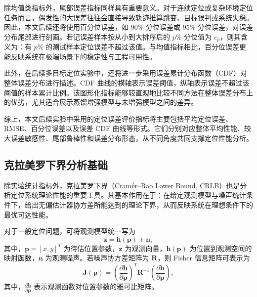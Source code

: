 除均值类指标外，尾部误差指标同样具有重要意义。对于连续定位或复杂环境定位任务而言，偶发性的大误差往往会直接导致轨迹推算跳变、目标误判或系统失稳。因此，本文后续还将使用百分位误差，如 $90\%$ 分位误差或 $95\%$ 分位误差，对误差分布尾部进行刻画。若记误差样本按从小到大排序后的 $p\%$ 分位值为 $e_{p}$，则其含义为：有 $p\%$ 的测试样本定位误差不超过该值。与均值指标相比，百分位误差更能反映系统在极端场景下的稳定性与工程可用性。

此外，在后续多目标定位实验中，还将进一步采用误差累计分布函数（CDF）对整体误差分布进行描述。CDF 曲线的横轴表示误差阈值，纵轴表示误差不超过该阈值的样本累计比例。该图形化指标能够较直观地比较不同方法在整体误差分布上的优劣，尤其适合展示蒸馏增强模型与未增强模型之间的差异。

综上，本文后续实验中采用的定位误差评价指标将主要包括平均定位误差、RMSE、百分位误差以及误差 CDF 曲线等形式。它们分别对应整体平均性能、较大误差敏感性、尾部鲁棒性和误差分布形态，从不同角度共同支撑定位性能分析。

\subsection{克拉美罗下界分析基础}
\label{subsec:2_5_2}

除实验统计指标外，克拉美罗下界（Cramér--Rao Lower Bound, CRLB）也是分析定位系统理论性能的重要工具。其基本作用在于：在给定观测模型与噪声统计条件下，给出无偏估计器协方差所能达到的理论下界，从而反映系统在理想条件下的最优可达性能\cite{Torrieri1984PassiveLocation,Wymeersch2009CooperativeLocalization}。

对于一般定位问题，可将观测模型统一写为
\begin{equation}
\mathbf{z}
=
\mathbf{h}(\mathbf{p})
+
\mathbf{n},
\label{eq:2_41_general_obs}
\end{equation}
其中，$\mathbf{p}=[x,y]^T$ 为待估位置参数，$\mathbf{z}$ 为观测向量，$\mathbf{h}(\mathbf{p})$ 为位置到观测空间的映射函数，$\mathbf{n}$ 为观测噪声。若噪声协方差矩阵为 $\mathbf{R}$，则 Fisher 信息矩阵可表示为
\begin{equation}
\mathbf{J}(\mathbf{p})
=
\left(
\frac{\partial \mathbf{h}}{\partial \mathbf{p}}
\right)^T
\mathbf{R}^{-1}
\left(
\frac{\partial \mathbf{h}}{\partial \mathbf{p}}
\right),
\label{eq:2_42_fim}
\end{equation}
其中，$\frac{\partial \mathbf{h}}{\partial \mathbf{p}}$ 表示观测函数对位置参数的雅可比矩阵。

